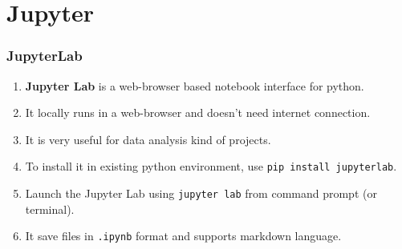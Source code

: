 \documentclass{beamer}
\begin{document}
\section{Jupyter}

\begin{frame}
\frametitle{JupyterLab}
\begin{enumerate}
\item \textbf{Jupyter Lab} is a web-browser based notebook interface for python.
\item It locally runs in a web-browser and doesn't need internet connection.
\item It is very useful for data analysis kind of projects.
\item To install it in existing python environment, use \lstinline{pip install jupyterlab}.
\item Launch the Jupyter Lab using \lstinline{jupyter lab} from command prompt (or terminal).
\item It save files in \lstinline{.ipynb} format and supports markdown language.
\end{enumerate}
\end{frame}
\end{document}
